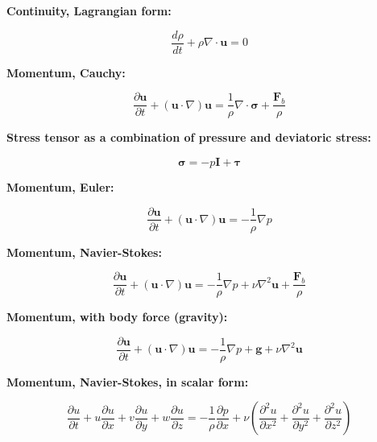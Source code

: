 \documentclass[12pt]{article}
\numberwithin{equation}{section}
\numberwithin{figure}{section}
\numberwithin{table}{section}
\begin{document}
\textbf{Continuity, Lagrangian form:}

\begin{equation}
  \frac{d\rho}{dt} + \rho \nabla \cdot \mathbf{u} = 0
\end{equation}

\textbf{Momentum, Cauchy:}

\begin{equation}
  \frac{\partial \mathbf{u}}{\partial t} + (\mathbf{u} \cdot \nabla) \mathbf{u} =
  \frac{1}{\rho} \nabla \cdot \boldsymbol{\sigma} + \frac{\mathbf{F}_b}{\rho}
\end{equation}

\textbf{Stress tensor as a combination of pressure and deviatoric stress:}

\begin{equation}
  \boldsymbol{\sigma} = -p \mathbf{I} + \boldsymbol{\tau}
\end{equation}

\textbf{Momentum, Euler:}

\begin{equation}
  \frac{\partial \mathbf{u}}{\partial t} + (\mathbf{u} \cdot \nabla) \mathbf{u} =
  - \frac{1}{\rho} \nabla p
\end{equation}

\textbf{Momentum, Navier-Stokes:}

\begin{equation}
  \frac{\partial \mathbf{u}}{\partial t} + (\mathbf{u} \cdot \nabla) \mathbf{u} =
  - \frac{1}{\rho} \nabla p + \nu \nabla^2 \mathbf{u} + \frac{\mathbf{F}_b}{\rho}
\end{equation}

\textbf{Momentum, with body force (gravity):}

\begin{equation}
  \frac{\partial \mathbf{u}}{\partial t} + (\mathbf{u} \cdot \nabla) \mathbf{u} =
  - \frac{1}{\rho} \nabla p + \mathbf{g} + \nu \nabla^2 \mathbf{u}
\end{equation}

\textbf{Momentum, Navier-Stokes, in scalar form:}

\begin{equation}
  \frac{\partial u}{\partial t} + 
  u \frac{\partial u}{\partial x} + 
  v \frac{\partial u}{\partial y} + 
  w \frac{\partial u}{\partial z} = 
  - \frac{1}{\rho} \frac{\partial p}{\partial x} + \nu \left( \frac{\partial^2 u}{\partial x^2} + \frac{\partial^2 u}{\partial y^2} + \frac{\partial^2 u}{\partial z^2} \right)
\end{equation}
\end{document}
